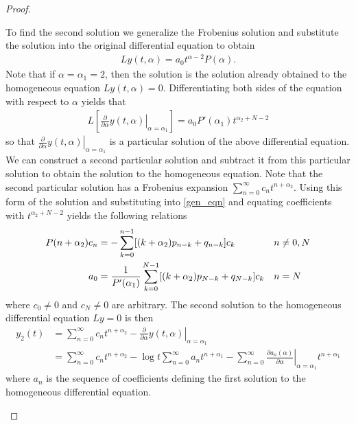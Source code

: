 \documentclass[12pt]{article}
\theoremstyle{definition}
\begin{document}
\begin{proof}
\begin{enumerate}
      To find the second solution we generalize the Frobenius solution
      and substitute the solution into the original differential equation to obtain
      \begin{align*}
        Ly(t,\alpha) = a_0 t^{\alpha - 2}P(\alpha).
      \end{align*}
      Note that if $\alpha=\alpha_1 = 2$, then the solution is the solution already obtained to the homogeneous equation $Ly(t,\alpha) = 0$.
      Differentiating both sides of the equation with respect to $\alpha$ yields that
      \begin{align}\label{gen_eqn}
        L\left[\left.\frac{\partial}{\partial\alpha}y(t,\alpha)\right|_{\alpha=\alpha_1}\right] = a_0P'(\alpha_1) t^{\alpha_2+N-2}
      \end{align}
      so that $\left.\frac{\partial}{\partial\alpha}y(t,\alpha)\right|_{\alpha=\alpha_1}$ is a particular solution of the above differential equation.
      We can construct a second particular solution and subtract it from this particular solution to obtain the solution to the homogeneous equation. Note that the second particular
      solution has a Frobenius expansion $\sum_{n=0}^{\infty}c_n t^{n+\alpha_2}$.
      Using this form of the solution and substituting into \eqref{gen_eqn} and equating coefficients with $t^{\alpha_2+N-2}$ yields the following
      relations
      \begin{align}\label{sec_rel}
        P(n + \alpha_2)c_n &=-\sum_{k=0}^{n-1} [(k + \alpha_2)p_{n-k} + q_{n-k}]c_k &n&\neq0,N \notag\\
        a_0 &= \frac{1}{P'(\alpha_1)}\sum_{k=0}^{N-1}[(k + \alpha_2)p_{N-k} + q_{N-k}]c_k &n&=N
      \end{align}
      where $c_0 \neq 0$ and $c_N\neq 0$ are arbitrary. The second solution to the homogeneous differential equation  $Ly=0$ is then
      \begin{align*}
        y_2(t) &= \sum_{n=0}^\infty c_n t^{n+\alpha_2} - \left.\frac{\partial}{\partial\alpha}y(t,\alpha)\right|_{\alpha=\alpha_1} \\
        &= \sum_{n=0}^\infty c_n t^{n+\alpha_2} - \log t\sum_{n=0}^{\infty}a_n t^{n+\alpha_1} - \sum_{n=0}^\infty\left.\frac{\partial a_n(\alpha)}{\partial \alpha}\right|_{\alpha=\alpha_1} t^{n+\alpha_1}
      \end{align*}
      where $a_n$ is the sequence of coefficients defining the first solution to the homogeneous differential equation.


\end{enumerate}
\end{proof}
\end{document}
